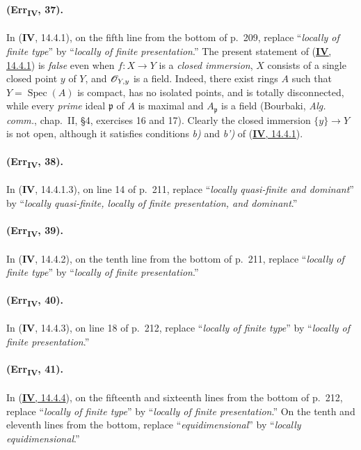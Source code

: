 {\paragraph{(Err\textsubscript{\textmd{IV}}, 37).}
In (\textbf{IV}, 14.4.1), on the fifth line from the bottom of p.~209, replace
``\emph{locally of finite type}'' by ``\emph{locally of finite presentation}.''  The
present statement of ({\hyperref[IV.14.4.1]{\textbf{IV}, 14.4.1}}) is \emph{false} even when $f:X\to Y$ is a
\emph{closed immersion}, $X$ consists of a single closed point $y$ of $Y$, and
$\mathscr{O}_{Y,y}$ is a field.  Indeed, there exist rings $A$ such that
$Y=\operatorname{Spec}(A)$ is compact, has no isolated points, and is
totally disconnected, while every \emph{prime} ideal $\mathfrak p$ of $A$ is
maximal and $A_\mathfrak p$ is a field (Bourbaki,
\emph{Alg. comm.}, chap.~II, \S4, exercises 16 and 17).  Clearly the
closed immersion $\{y\}\to Y$ is not open, although it satisfies
conditions \emph{b)} and \emph{b')} of ({\hyperref[IV.14.4.1]{\textbf{IV}, 14.4.1}}).

\paragraph{(Err\textsubscript{\textmd{IV}}, 38).}
In (\textbf{IV}, 14.4.1.3), on line 14 of p.~211, replace ``\emph{locally quasi-finite
and dominant}'' by ``\emph{locally quasi-finite, locally of finite presentation,
and dominant}.''

\paragraph{(Err\textsubscript{\textmd{IV}}, 39).}
In (\textbf{IV}, 14.4.2), on the tenth line from the bottom of p.~211, replace
``\emph{locally of finite type}'' by ``\emph{locally of finite presentation}.''

\paragraph{(Err\textsubscript{\textmd{IV}}, 40).}
In (\textbf{IV}, 14.4.3), on line 18 of p.~212, replace ``\emph{locally of finite type}''
by ``\emph{locally of finite presentation}.''

\paragraph{(Err\textsubscript{\textmd{IV}}, 41).}
In ({\hyperref[IV.14.4.4]{\textbf{IV}, 14.4.4}}), on the fifteenth and sixteenth lines from the bottom of
p.~212, replace ``\emph{locally of finite type}'' by ``\emph{locally of finite
presentation}.''  On the tenth and eleventh lines from the bottom,
replace ``\emph{equidimensional}'' by ``\emph{locally equidimensional}.''

}
